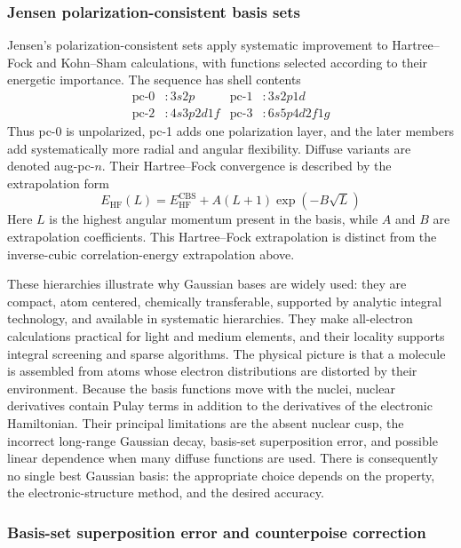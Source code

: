 \documentclass[11pt,a4paper,titlepage]{article}
\numberwithin{equation}{section}
\begin{document}
\subsubsection{Jensen polarization-consistent basis sets}

Jensen's polarization-consistent sets \citep{Jensen2001} apply systematic improvement to Hartree--Fock and
Kohn--Sham calculations, with functions selected according to their energetic
importance. The sequence has shell contents
\begin{align}
  \text{pc-0}&:3s2p &\text{pc-1}&:3s2p1d\\
  \text{pc-2}&:4s3p2d1f &\text{pc-3}&:6s5p4d2f1g
\end{align}
Thus pc-0 is unpolarized, pc-1 adds one polarization layer, and the later
members add systematically more radial and angular flexibility. Diffuse variants
are denoted aug-pc-$n$. Their Hartree--Fock convergence is described by the
extrapolation form \citep{Jensen2005}
\begin{equation}
  E_\text{HF}(L)=E_\text{HF}^\text{CBS}
  +A(L+1)\exp(-B\sqrt L)
\end{equation}
Here $L$ is the highest angular momentum present in the basis, while $A$ and
$B$ are extrapolation coefficients. This Hartree--Fock extrapolation is distinct from
the inverse-cubic correlation-energy extrapolation above.

These hierarchies illustrate why Gaussian bases are widely used: they are
compact, atom centered, chemically transferable, supported
by analytic integral technology, and available in systematic hierarchies.
They make all-electron calculations practical for light and medium elements,
and their locality supports integral screening and sparse algorithms. The
physical picture is that a molecule is assembled from atoms whose electron
distributions are distorted by their environment. Because the basis functions
move with the nuclei, nuclear derivatives contain Pulay terms in addition to
the derivatives of the electronic Hamiltonian.
Their principal limitations are the absent nuclear cusp, the incorrect
long-range Gaussian decay, basis-set superposition error, and possible linear
dependence when many diffuse functions are used. There is consequently no
single best Gaussian basis: the appropriate choice depends on the property,
the electronic-structure method, and the desired accuracy.

\subsubsection{Basis-set superposition error and counterpoise correction}
\end{document}
